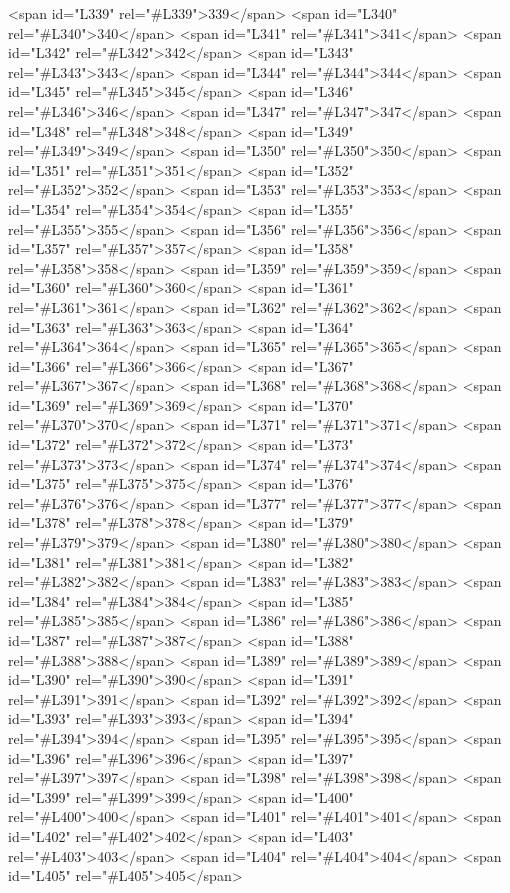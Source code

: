 <span id="L339" rel="#L339">339</span>
<span id="L340" rel="#L340">340</span>
<span id="L341" rel="#L341">341</span>
<span id="L342" rel="#L342">342</span>
<span id="L343" rel="#L343">343</span>
<span id="L344" rel="#L344">344</span>
<span id="L345" rel="#L345">345</span>
<span id="L346" rel="#L346">346</span>
<span id="L347" rel="#L347">347</span>
<span id="L348" rel="#L348">348</span>
<span id="L349" rel="#L349">349</span>
<span id="L350" rel="#L350">350</span>
<span id="L351" rel="#L351">351</span>
<span id="L352" rel="#L352">352</span>
<span id="L353" rel="#L353">353</span>
<span id="L354" rel="#L354">354</span>
<span id="L355" rel="#L355">355</span>
<span id="L356" rel="#L356">356</span>
<span id="L357" rel="#L357">357</span>
<span id="L358" rel="#L358">358</span>
<span id="L359" rel="#L359">359</span>
<span id="L360" rel="#L360">360</span>
<span id="L361" rel="#L361">361</span>
<span id="L362" rel="#L362">362</span>
<span id="L363" rel="#L363">363</span>
<span id="L364" rel="#L364">364</span>
<span id="L365" rel="#L365">365</span>
<span id="L366" rel="#L366">366</span>
<span id="L367" rel="#L367">367</span>
<span id="L368" rel="#L368">368</span>
<span id="L369" rel="#L369">369</span>
<span id="L370" rel="#L370">370</span>
<span id="L371" rel="#L371">371</span>
<span id="L372" rel="#L372">372</span>
<span id="L373" rel="#L373">373</span>
<span id="L374" rel="#L374">374</span>
<span id="L375" rel="#L375">375</span>
<span id="L376" rel="#L376">376</span>
<span id="L377" rel="#L377">377</span>
<span id="L378" rel="#L378">378</span>
<span id="L379" rel="#L379">379</span>
<span id="L380" rel="#L380">380</span>
<span id="L381" rel="#L381">381</span>
<span id="L382" rel="#L382">382</span>
<span id="L383" rel="#L383">383</span>
<span id="L384" rel="#L384">384</span>
<span id="L385" rel="#L385">385</span>
<span id="L386" rel="#L386">386</span>
<span id="L387" rel="#L387">387</span>
<span id="L388" rel="#L388">388</span>
<span id="L389" rel="#L389">389</span>
<span id="L390" rel="#L390">390</span>
<span id="L391" rel="#L391">391</span>
<span id="L392" rel="#L392">392</span>
<span id="L393" rel="#L393">393</span>
<span id="L394" rel="#L394">394</span>
<span id="L395" rel="#L395">395</span>
<span id="L396" rel="#L396">396</span>
<span id="L397" rel="#L397">397</span>
<span id="L398" rel="#L398">398</span>
<span id="L399" rel="#L399">399</span>
<span id="L400" rel="#L400">400</span>
<span id="L401" rel="#L401">401</span>
<span id="L402" rel="#L402">402</span>
<span id="L403" rel="#L403">403</span>
<span id="L404" rel="#L404">404</span>
<span id="L405" rel="#L405">405</span>
